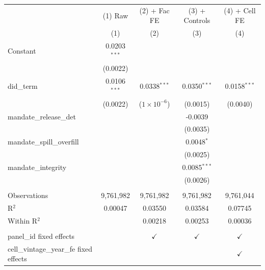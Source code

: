 
\begingroup
\centering
\begin{tabular}{lcccc}
   \toprule
                                            & (1) Raw        & (2) + Fac FE         & (3) + Controls & (4) + Cell FE \\   
                                            & (1)            & (2)                  & (3)            & (4)\\  
   \midrule 
   Constant                                 & 0.0203$^{***}$ &                      &                &   \\   
                                            & (0.0022)       &                      &                &   \\   
   did\_term                                & 0.0106$^{***}$ & 0.0338$^{***}$       & 0.0350$^{***}$ & 0.0158$^{***}$\\   
                                            & (0.0022)       & ($1\times 10^{-6}$)  & (0.0015)       & (0.0040)\\   
   mandate\_release\_det                    &                &                      & -0.0039        &   \\   
                                            &                &                      & (0.0035)       &   \\   
   mandate\_spill\_overfill                 &                &                      & 0.0048$^{*}$   &   \\   
                                            &                &                      & (0.0025)       &   \\   
   mandate\_integrity                       &                &                      & 0.0085$^{***}$ &   \\   
                                            &                &                      & (0.0026)       &   \\   
    \\
   Observations                             & 9,761,982      & 9,761,982            & 9,761,982      & 9,761,044\\  
   R$^2$                                    & 0.00047        & 0.03550              & 0.03584        & 0.07745\\  
   Within R$^2$                             &                & 0.00218              & 0.00253        & 0.00036\\  
    \\
   panel\_id fixed effects                  &                & $\checkmark$         & $\checkmark$   & $\checkmark$\\   
   cell\_vintage\_year\_fe fixed effects    &                &                      &                & $\checkmark$\\   
   \bottomrule
\end{tabular}
\par\endgroup


